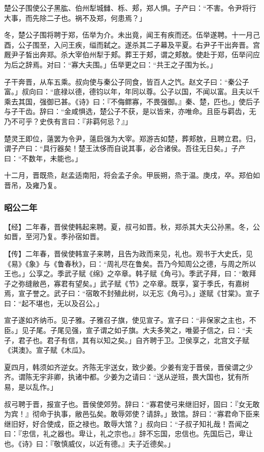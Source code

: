 \documentclass[]{article}
\begin{document}
楚公子围使公子黑肱、伯州犁城雠、栎、郏，郑人惧。子产曰：``不害。令尹将行大事，而先除二子也。祸不及郑，何患焉？」

冬，楚公子围将聘于郑，伍举为介。未出竟，闻王有疾而还。伍举遂聘。十一月己酉，公子围至，入问王疾，缢而弑之。遂杀其二子幕及平夏。右尹子干出奔晋。宫厩尹子皙出奔郑。杀大宰伯州犁于郏。葬王于郏，谓之郏敖。使赴于郑，伍举问应为后之辞焉。对曰：``寡大夫围。」伍举更之曰：``共王之子围为长。」

子干奔晋，从车五乘。叔向使与秦公子同食，皆百人之饩。赵文子曰：``秦公子富。」叔向曰：``底禄以德，德钧以年，年同以尊。公子以国，不闻以富。且夫以千乘去其国，强御已甚。《诗》曰：『不侮鳏寡，不畏强御。』秦、楚，匹也。」使后子与子干齿。辞曰：``金咸惧选，楚公子不获，是以皆来，亦唯命。且臣与羁齿，无乃不可乎？史佚有言曰：『非羁何忌？』」

楚灵王即位，薳罢为令尹，薳启强为大宰。郑游吉如楚，葬郏敖，且聘立君。归，谓子产曰：``具行器矣！楚王汰侈而自说其事，必合诸侯。吾往无日矣。」子产曰：``不数年，未能也。」

十二月，晋既烝，赵孟适南阳，将会孟子余。甲辰朔，烝于温。庚戌，卒。郑伯如晋吊，及雍乃复。

\hypertarget{header-n2386}{%
\subsubsection{昭公二年}\label{header-n2386}}

【经】二年春，晋侯使韩起来聘。夏，叔弓如晋。秋，郑杀其大夫公孙黑。冬，公如晋，至河乃复。季孙宿如晋。

【传】二年春，晋侯使韩宣子来聘，且告为政而来见，礼也。观书于大史氏，见《易》《象》与《鲁春秋》，曰：``周礼尽在鲁矣。吾乃今知周公之德，与周之所以王也。」公享之。季武子赋《绵》之卒章。韩子赋《角弓》。季武子拜，曰：``敢拜子之弥缝敝邑，寡君有望矣。」武子赋《节》之卒章。既享，宴于季氏，有嘉树焉，宣子誉之。武子曰：``宿敢不封殖此树，以无忘《角弓》。」遂赋《甘棠》。宣子曰：``起不堪也，无以及召公。」

宣子遂如齐纳币。见子雅。子雅召子旗，使见宣子。宣子曰：``非保家之主也，不臣。」见子尾。子尾见强，宣子谓之如子旗。大夫多笑之，唯晏子信之，曰：``夫子，君子也。君子有信，其有以知之矣。」自齐聘于卫。卫侯享之，北宫文子赋《淇澳》。宣子赋《木瓜》。

夏四月，韩须如齐逆女。齐陈无宇送女，致少姜。少姜有宠于晋侯，晋侯谓之少齐。谓陈无宇非卿，执诸中都。少姜为之请曰：``送从逆班，畏大国也，犹有所易，是以乱作。」

叔弓聘于晋，报宣子也。晋侯使郊劳。辞曰：``寡君使弓来继旧好，固曰：『女无敢为宾！』彻命于执事，敝邑弘矣。敢辱郊使？请辞。」致馆。辞曰：``寡君命下臣来继旧好，好合使成，臣之禄也。敢辱大馆？」叔向曰：``子叔子知礼哉！吾闻之曰：『忠信，礼之器也。卑让，礼之宗也。』辞不忘国，忠信也。先国后己，卑让也。《诗》曰：『敬慎威仪，以近有德。』夫子近德矣。」
\end{document}
